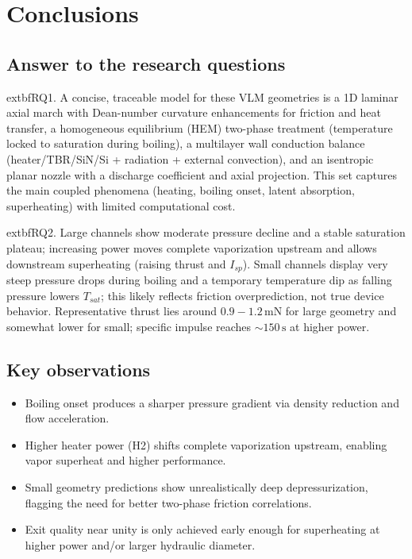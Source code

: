 \documentclass[11pt,a4paper]{article}
\begin{document}
\section{Conclusions}

\subsection*{Answer to the research questions}
	extbf{RQ1.} A concise, traceable model for these VLM geometries is a 1D laminar axial march with Dean-number curvature enhancements for friction and heat transfer, a homogeneous equilibrium (HEM) two-phase treatment (temperature locked to saturation during boiling), a multilayer wall conduction balance (heater/TBR/SiN/Si + radiation + external convection), and an isentropic planar nozzle with a discharge coefficient and axial projection. This set captures the main coupled phenomena (heating, boiling onset, latent absorption, superheating) with limited computational cost.

	extbf{RQ2.} Large channels show moderate pressure decline and a stable saturation plateau; increasing power moves complete vaporization upstream and allows downstream superheating (raising thrust and \(I_{sp}\)). Small channels display very steep pressure drops during boiling and a temporary temperature dip as falling pressure lowers \(T_{sat}\); this likely reflects friction overprediction, not true device behavior. Representative thrust lies around \(0.9{-}1.2\,\text{mN}\) for large geometry and somewhat lower for small; specific impulse reaches \(\sim 150\,\text{s}\) at higher power.

\subsection*{Key observations}
\begin{itemize}[nosep]
  \item Boiling onset produces a sharper pressure gradient via density reduction and flow acceleration.
  \item Higher heater power (H2) shifts complete vaporization upstream, enabling vapor superheat and higher performance.
  \item Small geometry predictions show unrealistically deep depressurization, flagging the need for better two-phase friction correlations.
  \item Exit quality near unity is only achieved early enough for superheating at higher power and/or larger hydraulic diameter.
\end{itemize}
\end{document}
